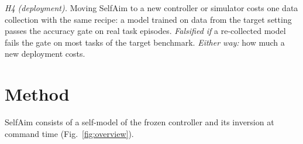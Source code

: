 \documentclass[conference]{IEEEtran}
\begin{document}
\emph{H4 (deployment).} Moving SelfAim to a new controller or simulator costs one data collection with the same recipe: a model trained on data from the target setting passes the accuracy gate on real task episodes. \emph{Falsified if} a re-collected model fails the gate on most tasks of the target benchmark. \emph{Either way:} how much a new deployment costs.

\section{Method}\label{sec:method}
SelfAim consists of a self-model of the frozen controller and its inversion at command time (Fig.~\ref{fig:overview}).
\end{document}
